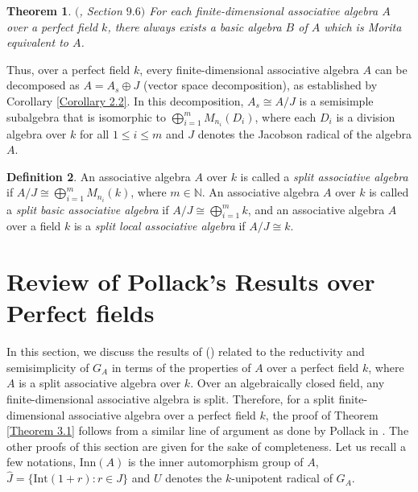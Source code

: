 \documentclass[12pt]{amsart}
\newtheorem{theorem}{Theorem}[section]
\theoremstyle{definition}
\newtheorem{definition}[theorem]{Definition}
\numberwithin{equation}{section}
\begin{document}
\vskip2mm 
\begin{theorem}\label{Theorem 2.5}
$($\cite{Pierce}, \emph{Section} $9.6)$ For each finite-dimensional associative algebra $A$ over a perfect field $k$, there always exists a basic algebra $B$ of $A$ which is Morita equivalent to $A$.   
\end{theorem}
\vskip2mm
\noindent
Thus, over a perfect field $k$, every finite-dimensional associative algebra \( A \) can be decomposed as \( A = A_s \oplus J \) (vector space decomposition), as established by Corollary \ref{Corollary 2.2}. In this decomposition, \( A_s\cong A/J \) is a semisimple subalgebra that is isomorphic to \( \bigoplus_{i=1}^{m} M_{n_{i}}(D_{i}) \), where each $D_i$ is a division algebra over $k$ for all $1\leq i\leq m$ and \( J \) denotes the Jacobson radical of the algebra \( A \). 
\vskip2mm
\begin{definition}\label{Definition 2.6}
An associative algebra $A$ over $k$ is called a \emph{split associative algebra} if $A/J\cong \bigoplus_{i=1}^{m} M_{n_{i}}(k)$, where $m\in \mathbb{N}$. An associative algebra $A$ over $k$ is called a \emph{split basic associative algebra} if $A/J\cong \bigoplus_{i=1}^{m}k$, and an associative algebra $A$ over a field $k$ is a \emph{split local associative algebra} if $A/J\cong k$.  
\end{definition}

\vskip2mm
\section{Review of Pollack's Results over Perfect fields}\label{Review}
\vskip2mm
\noindent
In this section, we discuss the results of (\cite{Pollack}) related to the reductivity and semisimplicity of $G_A$ in terms of the properties of $A$ over a perfect field $k$, where $A$ is a split associative algebra over $k$. Over an algebraically closed field, any finite-dimensional associative algebra is split. Therefore, for a split finite-dimensional associative algebra over a perfect field $k$, the proof of Theorem \ref{Theorem 3.1} follows from a similar line of argument as done by Pollack in \cite {Pollack}. The other proofs of this section are given for the sake of completeness. Let us recall a few notations, $\text{Inn}(A)$ is the inner automorphism group of $A$, $\hat{J}=\{\text{Int}(1+r):r\in J\}$ and $U$ denotes the $k$-unipotent radical of $G_A$.
\end{document}
